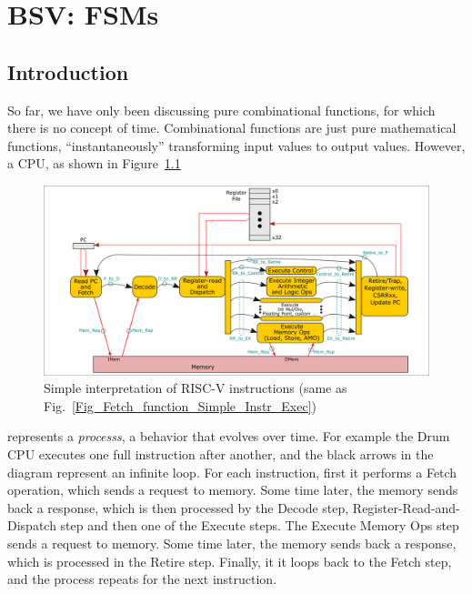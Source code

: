

\chapter{BSV: FSMs}


\setcounter{page}{1}
\renewcommand{\thepage}{\arabic{chapter}-\arabic{page}}

\label{ch_FSMs}


\section{Introduction}

So far, we have only been discussing pure combinational functions, for
which there is no concept of time.  Combinational functions are just
pure mathematical functions, ``instantaneously'' transforming input
values to output values.  However, a CPU, as shown in
Figure~\ref{Fig_FSMs_Simple_Instr_Exec}
\begin{figure}[htbp]
  \centerline{\includegraphics[width=6in,angle=0]{ch030_RISCV_Design_Space/Figures/Fig_Instr_Exec_w_structs}}
  \caption{\label{Fig_FSMs_Simple_Instr_Exec}
           Simple interpretation of RISC-V instructions
	   (same as Fig.~\ref{Fig_Fetch_function_Simple_Instr_Exec})}
\end{figure}
represents a \emph{processs}, a behavior that evolves over time.  For
example the Drum CPU executes one full instruction after another, and
the black arrows in the diagram represent an infinite loop. For each
instruction, first it performs a Fetch operation, which sends a
request to memory. Some time later, the memory sends back a response,
which is then processed by the Decode step, Register-Read-and-Dispatch
step and then one of the Execute steps.  The Execute Memory Ops step
sends a request to memory. Some time later, the memory sends back a
response, which is processed in the Retire step.  Finally, it it loops
back to the Fetch step, and the process repeats for the next
instruction.

